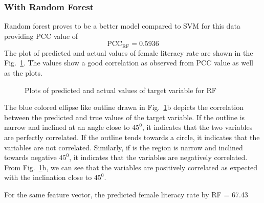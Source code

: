 \documentclass{article}
\begin{document}
\subsubsection{With Random Forest}
Random forest proves to be a better model compared to SVM for this data providing PCC value of
\begin{equation*}
\text{PCC}_\text{RF} = 0.5936
\end{equation*} 
The plot of predicted and actual values of female literacy rate are shown in the Fig.~\ref{RF_Coorelation}. The values show a good correlation as observed from PCC value as well as the plots. 
\begin{figure}[H]
	\centering
	\caption{Plots of predicted and actual values of target variable for RF}
	\label{RF_Coorelation}
\end{figure}
The blue colored ellipse like outline drawn in Fig.~\ref{RF_Coorelation}b depicts the correlation between the predicted and true values of the target variable. If the outline is narrow and inclined at an angle close to $45^0$, it indicates that the two variables are perfectly correlated. If the outline tends towards a circle, it indicates that the variables are not correlated. Similarly, if is the region is narrow and inclined towards negative $45^0$, it indicates that the variables are negatively correlated. From Fig.~\ref{RF_Coorelation}b, we can see that the variables are positively correlated as expected with the inclination close to $45^0$. 

For the same feature vector, the predicted female literacy rate by RF = 67.43
\end{document}
